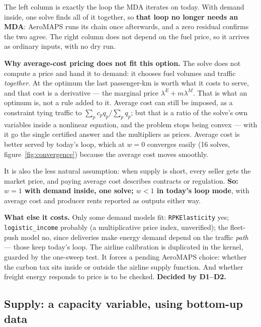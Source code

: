 \documentclass[11pt,a4paper]{article}
\newcommand{\var}[1]{\texttt{\small #1}}
\begin{document}
\noindent The left column is exactly the loop the MDA iterates on today. With demand inside,
one solve finds all of it together, so \textbf{that loop no longer needs an MDA}: AeroMAPS runs
its chain once afterwards, and a zero residual confirms the two agree. The right column does
not depend on the fuel price, so it arrives as ordinary inputs, with no dry run.

\begin{keybox}
\textbf{Why average-cost pricing does not fit this option.} The solve does not compute a price
and hand it to demand: it chooses fuel volumes and traffic \emph{together}. At the optimum the
last passenger-km is worth what it costs to serve, and that cost is a derivative --- the
marginal price $\lambda^{E} + m\lambda^{M}$. That is what an optimum is, not a rule added to it.
Average cost can still be imposed, as a constraint tying traffic to $\sum_p c_p q_p / \sum_p
q_p$; but that is a ratio of the solve's own variables inside a nonlinear equation, and the
problem stops being convex --- with it go the single certified answer and the multipliers as
prices. Average cost is better served by today's loop, which at $w=0$ converges easily
(16 solves, figure~\ref{fig:convergence}) because the average cost moves smoothly.

\medskip
It is also the less natural assumption: when supply is short, every seller gets the market
price, and paying average cost describes contracts or regulation. \textbf{So: $w=1$ with
demand inside, one solve; $w<1$ in today's loop mode}, with average cost and producer rents
reported as outputs either way.
\end{keybox}

\noindent \textbf{What else it costs.} Only some demand models fit: \var{RPKElasticity} yes;
\var{logistic\_income} probably (a multiplicative price index, unverified); the fleet-push
model no, since deliveries make energy demand depend on the traffic \emph{path} --- those keep
today's loop. The airline calibration is duplicated in the kernel, guarded by the one-sweep
test. It forces a pending AeroMAPS choice: whether the carbon tax sits inside or outside the
airline supply function. And whether freight energy responds to price is to be checked.
\textbf{Decided by D1--D2.}

\subsection{Supply: a capacity variable, using bottom-up data}
\label{sec:capacityvariable}
\end{document}
